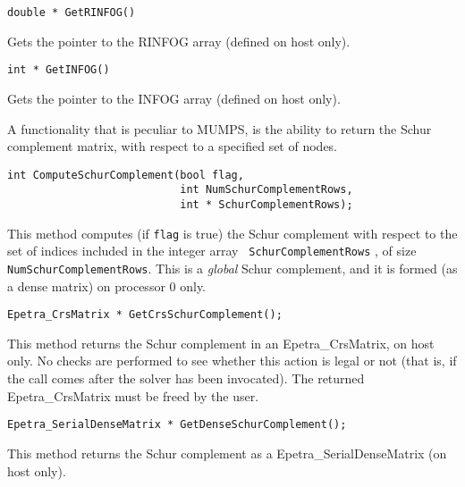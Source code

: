 \documentclass[11pt]{SANDreport}
\begin{document}
\medskip

\begin{verbatim}
double * GetRINFOG() 
\end{verbatim}
Gets the pointer to the RINFOG array (defined on host only).

\medskip

\begin{verbatim}
int * GetINFOG() 
\end{verbatim}
Gets the pointer to the INFOG array (defined on host only).

\bigskip
  
A functionality that is peculiar to MUMPS, is the ability to return
the Schur complement matrix, with respect to a specified set of nodes.

\begin{verbatim}
int ComputeSchurComplement(bool flag,
                           int NumSchurComplementRows, 
                           int * SchurComplementRows);
\end{verbatim}
This method computes (if \verb!flag! is true) the Schur complement with
respect to the set of indices included in the integer array {\tt
  SchurComplementRows} , of size {\tt NumSchurComplementRows}. This is a
{\sl global} Schur complement, and it is formed (as a dense matrix) on
processor 0 only.

\medskip

\begin{verbatim}
Epetra_CrsMatrix * GetCrsSchurComplement();
\end{verbatim}
This method returns the Schur complement in an Epetra\_CrsMatrix, on host
only. No checks are performed to see whether this action is legal or not
(that is, if the call comes after the solver has been invocated).
The returned Epetra\_CrsMatrix must be freed by the user.

\medskip

\begin{verbatim}
Epetra_SerialDenseMatrix * GetDenseSchurComplement();
\end{verbatim}
This method returns the Schur complement as a Epetra\_SerialDenseMatrix
(on host only).

\medskip
\end{document}
